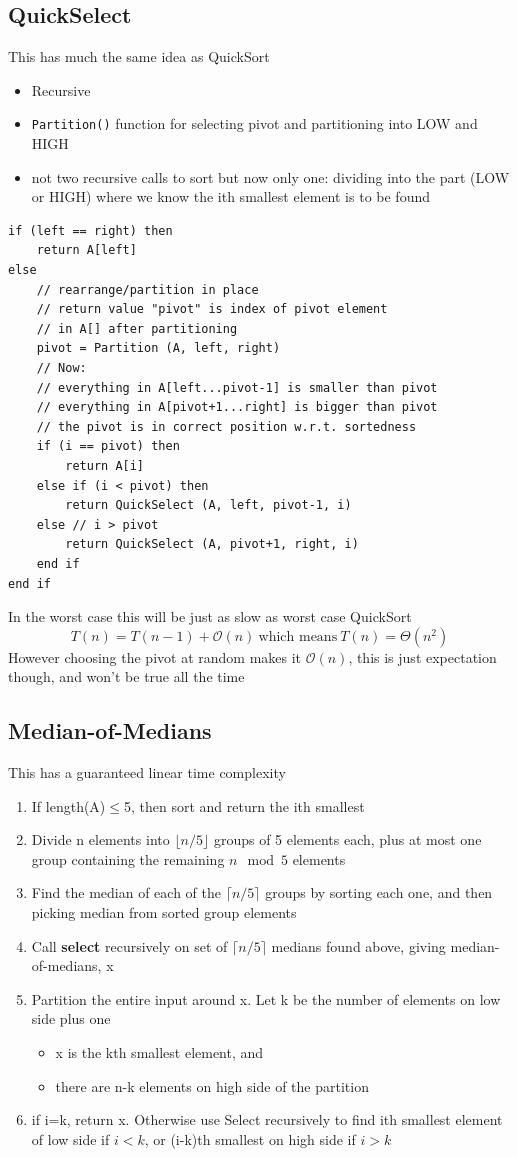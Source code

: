 \documentclass{article}[18pt]
\begin{document}
\subsection{QuickSelect}
This has much the same idea as QuickSort
\begin{itemize}
	\item Recursive
	\item \texttt{Partition()} function for selecting pivot and partitioning into LOW and HIGH
	\item not two recursive calls to sort but now only one: dividing into the part (LOW or HIGH) where we know the ith smallest element is to be found
\end{itemize}
\begin{lstlisting}[caption=QuickSelect ({int A[1..n], int left, int right, int i})]
if (left == right) then
	return A[left]
else
	// rearrange/partition in place
	// return value "pivot" is index of pivot element
	// in A[] after partitioning
	pivot = Partition (A, left, right)
	// Now:
	// everything in A[left...pivot-1] is smaller than pivot
	// everything in A[pivot+1...right] is bigger than pivot
	// the pivot is in correct position w.r.t. sortedness
	if (i == pivot) then
		return A[i]
	else if (i < pivot) then
		return QuickSelect (A, left, pivot-1, i)
	else // i > pivot
		return QuickSelect (A, pivot+1, right, i)
	end if
end if
\end{lstlisting}
In the worst case this will be just as slow as worst case QuickSort
$$T(n)=T(n-1)+\mathcal{O}(n) \ \text{which means} \ T(n)=\Theta(n^2)$$
However choosing the pivot at random makes it $\mathcal{O}(n)$, this is just expectation though, and won't be true all the time
\subsection{Median-of-Medians}
This has a guaranteed linear time complexity
\begin{enumerate}
	\item If length(A)$\leqslant$5, then sort and return the ith smallest
	\item Divide n elements into $\lfloor n/5 \rfloor$ groups of 5 elements each, plus at most one group containing the remaining $n\mod5$ elements
	\item Find the median of each of the $\lceil n/5\rceil$ groups by sorting each one, and then picking median from sorted group elements
	\item Call \textbf{select} recursively on set of $\lceil n/5\rceil$ medians found above, giving median-of-medians, x
	\item Partition the entire input around x. Let k be the number of elements on low side plus one
	\begin{itemize}
		\item x is the kth smallest element, and
		\item there are n-k elements on high side of the partition
	\end{itemize}
	\item if i=k, return x. Otherwise use Select recursively to find ith smallest element of low side if $i<k$, or (i-k)th smallest on high side if $i>k$
\end{enumerate}
\end{document}
